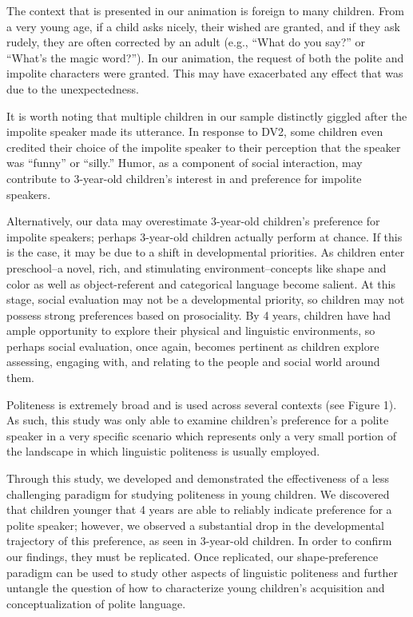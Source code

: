 \documentclass[
  english,
  man,floatsintext]{apa6}
\begin{document}
The context that is presented in our animation is foreign to many children. From a very young age, if a child asks nicely, their wished are granted, and if they ask rudely, they are often corrected by an adult (e.g., ``What do you say?'' or ``What's the magic word?''). In our animation, the request of both the polite and impolite characters were granted. This may have exacerbated any effect that was due to the unexpectedness.

It is worth noting that multiple children in our sample distinctly giggled after the impolite speaker made its utterance. In response to DV2, some children even credited their choice of the impolite speaker to their perception that the speaker was ``funny'' or ``silly.'' Humor, as a component of social interaction, may contribute to 3-year-old children's interest in and preference for impolite speakers.

Alternatively, our data may overestimate 3-year-old children's preference for impolite speakers; perhaps 3-year-old children actually perform at chance. If this is the case, it may be due to a shift in developmental priorities. As children enter preschool--a novel, rich, and stimulating environment--concepts like shape and color as well as object-referent and categorical language become salient. At this stage, social evaluation may not be a developmental priority, so children may not possess strong preferences based on prosociality. By 4 years, children have had ample opportunity to explore their physical and linguistic environments, so perhaps social evaluation, once again, becomes pertinent as children explore assessing, engaging with, and relating to the people and social world around them.

Politeness is extremely broad and is used across several contexts (see Figure 1). As such, this study was only able to examine children's preference for a polite speaker in a very specific scenario which represents only a very small portion of the landscape in which linguistic politeness is usually employed.

Through this study, we developed and demonstrated the effectiveness of a less challenging paradigm for studying politeness in young children. We discovered that children younger that 4 years are able to reliably indicate preference for a polite speaker; however, we observed a substantial drop in the developmental trajectory of this preference, as seen in 3-year-old children. In order to confirm our findings, they must be replicated. Once replicated, our shape-preference paradigm can be used to study other aspects of linguistic politeness and further untangle the question of how to characterize young children's acquisition and conceptualization of polite language.
\end{document}
